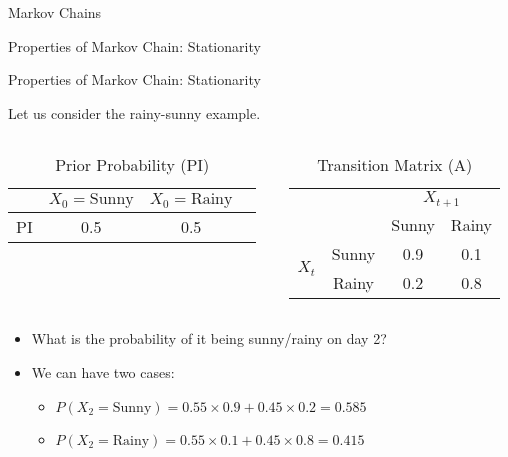 \documentclass{beamer}
\begin{document}
\begin{section}{Markov Chains}
\begin{frame}{Properties of Markov Chain: Stationarity}
\begin{itemize}
        \end{itemize}
      \end{frame}

      \begin{frame}{Properties of Markov Chain: Stationarity}

        Let us consider the rainy-sunny example.
      
        \begin{columns}[T] %
          \begin{column}{0.48\textwidth} %
            \begin{table}[h]
              \centering
              \caption{Prior Probability (PI)}
              \begin{tabular}{cccc}
                \toprule
                & \(X_0 = \text{Sunny}\) & \(X_0 = \text{Rainy}\) \\
                \midrule
                PI & 0.5 & 0.5 \\
                \bottomrule
              \end{tabular}
            \end{table}
          \end{column}
          \begin{column}{0.48\textwidth} %
            \begin{table}[h]
              \centering
              \caption{Transition Matrix (A)}
              \begin{tabular}{cccc}
                \toprule
                & & \multicolumn{2}{c}{\(X_{t+1}\)} \\
                \cmidrule{3-4}
                & & Sunny & Rainy \\
                \midrule
                \multirow{2}{*}{\(X_t\)} & Sunny & 0.9 & 0.1 \\
                & Rainy & 0.2 & 0.8 \\
                \bottomrule
              \end{tabular}
            \end{table}
          \end{column}
        \end{columns}

        \begin{itemize}
            \item What is the probability of it being sunny/rainy on day 2?
            \pause \item We can have two cases:
            \begin{itemize}
                \item $P(X_2 = \text{Sunny}) = 0.55 \times 0.9 + 0.45 \times 0.2 = 0.585$
                \item $P(X_2 = \text{Rainy}) = 0.55 \times 0.1 + 0.45 \times 0.8 = 0.415$
            \end{itemize}
                


\end{itemize}
\end{frame}
\end{section}
\end{document}
